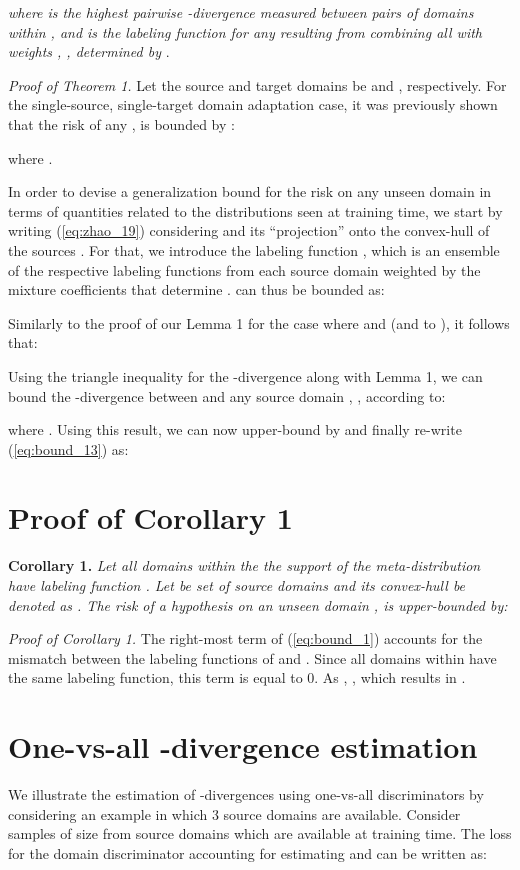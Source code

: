 \documentclass{article}
\begin{document}
\textit{where  is the highest pairwise -divergence measured between pairs of domains within ,  and  is the labeling function for any  resulting from combining all  with weights , , determined by }.

\textit{Proof of Theorem 1.} Let the source and target domains be  and , respectively. For the single-source, single-target domain adaptation case, it was previously shown that the risk of any ,  is bounded by \cite{zhao2019learning}:

where .

In order to devise a generalization bound for the risk on any unseen domain in terms of quantities related to the distributions seen at training time, we start by writing (\ref{eq:zhao_19}) considering  and its ``projection'' onto the convex-hull of the sources . For that, we introduce the labeling function , which is an ensemble of the respective labeling functions from each source domain weighted by the mixture coefficients that determine .  can thus be bounded as:


Similarly to the proof of our Lemma 1 for the case where  and  (and to \cite{zhao2018adversarial}), it follows that:


Using the triangle inequality for the -divergence along with Lemma 1, we can bound the -divergence between  and any source domain , , according to:


where . Using this result, we can now upper-bound  by  and finally re-write (\ref{eq:bound_13}) as:


\section{Proof of Corollary 1}
\textbf{Corollary 1.} \textit{Let all domains within the the support of the meta-distribution  have labeling function . Let  be set of source domains and its convex-hull be denoted as . The risk  of a hypothesis  on an unseen domain , is upper-bounded by:}

\textit{Proof of Corollary 1.} The right-most term of (\ref{eq:bound_1}) accounts for the mismatch between the labeling functions of  and . Since all domains within  have the same labeling function, this term is equal to 0. As , , which results in . 

\section{One-vs-all -divergence estimation}
We illustrate the estimation of -divergences using one-vs-all discriminators by considering an example in which 3 source domains are available. Consider samples of size  from  source domains which are available at training time. The loss  for the domain discriminator  accounting for estimating  and  can be written as:
\end{document}
